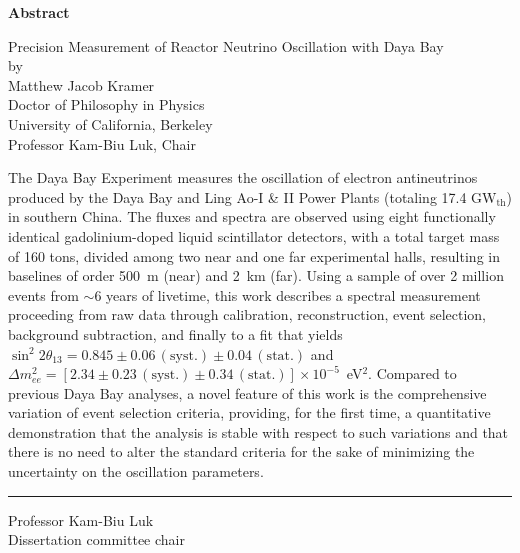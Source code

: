 \MyDoubleSpacing

\begin{center}
  \mylarge
  \textbf{Abstract}

  \vspace{1.5\baselineskip}
  Precision Measurement of Reactor Neutrino Oscillation with Daya Bay\\
  \vspace{\baselineskip} by\\
  \vspace{\baselineskip} Matthew Jacob Kramer\\
  Doctor of Philosophy in Physics\\
  University of California, Berkeley\\
  Professor Kam-Biu Luk, Chair
  \vspace{\baselineskip}
\end{center}

\normalsize
\MyDoubleSpacing
\noindent
%
The Daya Bay Experiment measures the oscillation of electron antineutrinos
produced by the Daya Bay and Ling Ao-I \& II Power Plants (totaling 17.4
GW$_\mathrm{th}$) in southern China. The fluxes and spectra are observed using
eight functionally identical gadolinium-doped liquid scintillator detectors,
with a total target mass of 160 tons, divided among two near and one far
experimental halls, resulting in baselines of order 500~m (near) and
2~km (far). Using a sample of over 2 million events from $\sim$6 years of livetime,
this work describes a spectral measurement proceeding from raw data through
calibration, reconstruction, event selection, background subtraction, and
finally to a fit that yields $\sin^2 2\theta_{13} = 0.845 \pm
0.06\,\mathrm{(syst.)} \pm 0.04\,\mathrm{(stat.)}$ and $\Delta m^2_{ee} = [ 2.34
\pm 0.23\,\mathrm{(syst.)} \pm 0.34\,\mathrm{(stat.)} ] \times 10^{-5}$~eV$^2$.
Compared to previous Daya Bay analyses, a novel feature of this work is
the comprehensive variation of event selection criteria, providing, for the first time, a quantitative demonstration that the analysis is stable with respect to such variations and that there is no need to alter the standard criteria for the sake of minimizing the uncertainty on the oscillation parameters.

\SingleSpacing
\vspace{2.5\baselineskip}
\hfill
\begin{minipage}{0.4\textwidth}
  \hrule\vspace{0.4\baselineskip}
  Professor Kam-Biu Luk\\
  Dissertation committee chair
\end{minipage}

\clearpage